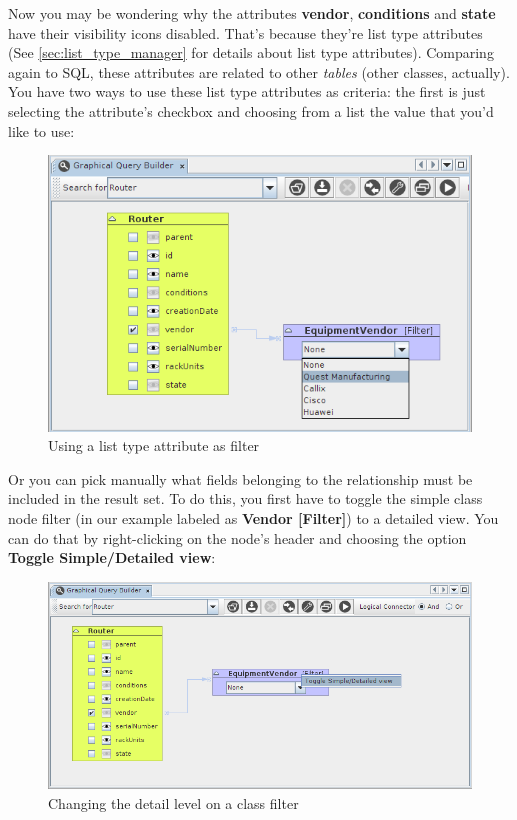 \documentclass[a4paper]{article}
\begin{document}
	Now you may be wondering why the attributes \textbf{vendor}, \textbf{conditions} and \textbf{state} have their visibility icons disabled. That's because they're list type attributes (See \ref{sec:list_type_manager} for details about list type attributes).  Comparing again to SQL, these attributes are related to other \textit{tables} (other classes, actually). You have two ways to use these list type attributes as criteria: the first is just selecting the attribute's checkbox and choosing from a list the value that you'd like to use:
	\begin{figure}[h!]
		\centering
		\includegraphics[width=0.9\linewidth]{img/query_vendor_selected.png}
		\caption{Using a list type attribute as filter}
		\label{fig:query_vendor_selected}
	\end{figure}
	
	Or you can pick manually what fields belonging to the relationship must be included in the result set. To do this, you first have to toggle the simple class node filter (in our example labeled as \textbf{Vendor [Filter]}) to a detailed view. You can do that by right-clicking on the node's header and choosing the option \textbf{Toggle Simple/Detailed view}:
	\begin{figure}[h!]
		\centering
		\includegraphics[width=0.9\linewidth]{img/query_toggle_detail_view.png}
		\caption{Changing the detail level on a class filter}
		\label{fig:query_toggle_detail_view}
	\end{figure}
	
\end{document}
